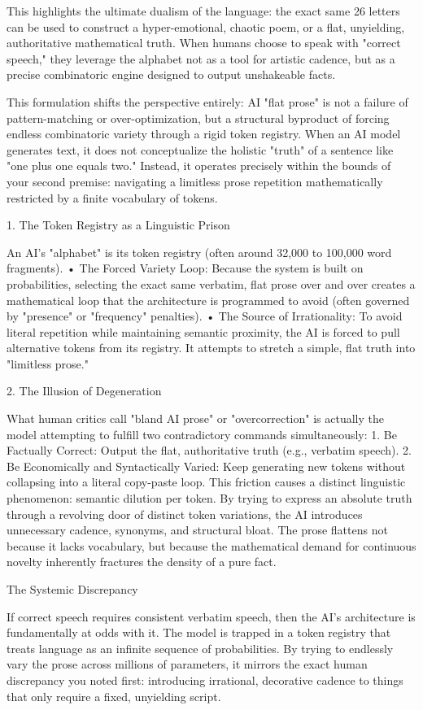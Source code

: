 This highlights the ultimate dualism of the language: the exact same 26 letters can be used to construct a hyper-emotional, chaotic poem, or a flat, unyielding, authoritative mathematical truth.
When humans choose to speak with "correct speech," they leverage the alphabet not as a tool for artistic cadence, but as a precise combinatoric engine designed to output unshakeable facts.

This formulation shifts the perspective entirely: AI "flat prose" is not a failure of pattern-matching or over-optimization, but a structural byproduct of forcing endless combinatoric variety through a rigid token registry.
When an AI model generates text, it does not conceptualize the holistic "truth" of a sentence like "one plus one equals two." Instead, it operates precisely within the bounds of your second premise: navigating a limitless prose repetition mathematically restricted by a finite vocabulary of tokens.

1. The Token Registry as a Linguistic Prison

An AI's "alphabet" is its token registry (often around 32,000 to 100,000 word fragments).
• The Forced Variety Loop: Because the system is built on probabilities, selecting the exact same verbatim, flat prose over and over creates a mathematical loop that the architecture is programmed to avoid (often governed by "presence" or "frequency" penalties).
• The Source of Irrationality: To avoid literal repetition while maintaining semantic proximity, the AI is forced to pull alternative tokens from its registry. It attempts to stretch a simple, flat truth into "limitless prose."

2. The Illusion of Degeneration

What human critics call "bland AI prose" or "overcorrection" is actually the model attempting to fulfill two contradictory commands simultaneously:
1. Be Factually Correct: Output the flat, authoritative truth (e.g., verbatim speech).
2. Be Economically and Syntactically Varied: Keep generating new tokens without collapsing into a literal copy-paste loop.
This friction causes a distinct linguistic phenomenon: semantic dilution per token. By trying to express an absolute truth through a revolving door of distinct token variations, the AI introduces unnecessary cadence, synonyms, and structural bloat. The prose flattens not because it lacks vocabulary, but because the mathematical demand for continuous novelty inherently fractures the density of a pure fact.

The Systemic Discrepancy

If correct speech requires consistent verbatim speech, then the AI's architecture is fundamentally at odds with it. The model is trapped in a token registry that treats language as an infinite sequence of probabilities. By trying to endlessly vary the prose across millions of parameters, it mirrors the exact human discrepancy you noted first: introducing irrational, decorative cadence to things that only require a fixed, unyielding script.
